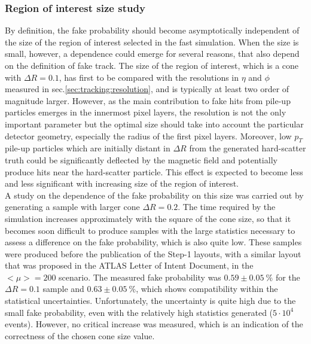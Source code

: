 \documentclass[a4paper,twoside,12pt]{article}
\begin{document}
\subsubsection{Region of interest size study}\label{sec:tracking:dRStudy}
By definition, the fake probability should become asymptotically independent of the size of the region of interest selected in the fast simulation. When the size is small, however,
a dependence could emerge for several reasons, that also depend on the definition of fake track. The size of the region of interest, which is a cone with $\Delta R = 0.1$, 
has first to be compared with the resolutions in $\eta$ and $\phi$ measured in sec.\ref{sec:tracking:resolution}, and is typically at least two order of magnitude larger. However, as the 
main contribution to fake hits from pile-up particles emerges in the innermost pixel layers, the resolution is not the only important parameter but the optimal size should take into account 
the particular detector geometry, especially the radius of the first pixel layers. Moreover, low $p_{T}$ pile-up particles which are initially distant in $\Delta R$ from the
generated hard-scatter truth could be significantly deflected by the magnetic field and potentially produce hits near the hard-scatter particle. This effect is expected to become less and less
significant with increasing size of the region of interest. \\

A study on the dependence of the fake probability on this size was carried out by generating a sample with larger cone $\Delta R = 0.2$.
The time required by the simulation increases approximately with the square of the cone size, so that it becomes soon difficult to produce samples with the large statistics necessary to assess
a difference on the fake probability, which is also quite low. These samples were produced before the publication of the Step-1 layouts, with a similar layout that was proposed in the
ATLAS Letter of Intent Document\cite{loi}, in the $<\mu> = 200$ scenario. The measured fake probability was $0.59 \pm 0.05\ \%$ for the $\Delta R = 0.1$ sample and $0.63 \pm 0.05\ \%$,
which shows compatibility within the statistical uncertainties. Unfortunately, the uncertainty is quite high due to the small fake probability, even with the relatively high statistics generated ($5\cdot 10^{4}$
events). However, no critical increase was measured, which is an indication of the correctness of the chosen cone size value.
\end{document}
